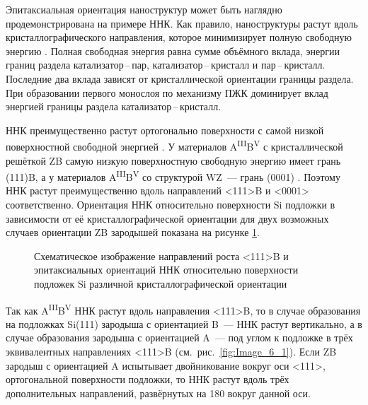Эпитаксиальная ориентация наноструктур может быть наглядно продемонстрирована
на примере ННК. Как правило, наноструктуры растут вдоль кристаллографического
направления, которое минимизирует полную свободную энергию \cite{Wagner1964}.
Полная свободная энергия равна сумме объёмного вклада, энергии границ раздела
катализатор\,--\,пар, катализатор\,--\,кристалл и пар\,--\,кристалл. Последние
два вклада зависят от кристаллической ориентации границы раздела. При
образовании первого монослоя по механизму ПЖК доминирует вклад энергией границы
раздела катализатор\,--\,кристалл.

ННК преимущественно растут ортогонально поверхности с самой низкой
поверхностной свободной энергией \cite{Wagner1964}. У материалов
A\textsuperscript{III}B\textsuperscript{V} с кристаллической решёткой ZB самую
низкую поверхностную свободную энергию имеет грань (111)B, а у материалов
A\textsuperscript{III}B\textsuperscript{V} со структурой WZ~--- грань (0001)
\cite{Fortuna2010}. Поэтому ННК растут преимущественно вдоль направлений <111>B
и <0001> соответственно. Ориентация ННК относительно поверхности Si подложки в
зависимости от её кристаллографической ориентации для двух возможных случаев
ориентации ZB зародышей показана на рисунке \cref{fig:Image_6}.

\begin{figure}[ht]   \caption{Схематическое
			изображение направлений роста <111>B и эпитаксиальных ориентаций ННК
			относительно поверхности подложек Si различной кристаллографической
	ориентации}\label{fig:Image_6} \end{figure}

Так как A\textsuperscript{III}B\textsuperscript{V} ННК растут вдоль направления
<111>B, то в случае образования на подложках Si(111) зародыша с ориентацией
B~--- ННК растут вертикально, а в случае образования зародыша с ориентацией
A~--- под углом к подложке в трёх эквивалентных направлениях <111>B
(см.~рис.~\cref{fig:Image_6_1}). Если ZB зародыш с ориентацией A испытывает
двойникование вокруг оси <111>, ортогональной поверхности подложки, то ННК
растут вдоль трёх дополнительных направлений, развёрнутых на 180{\textdegree}
вокруг данной оси.

